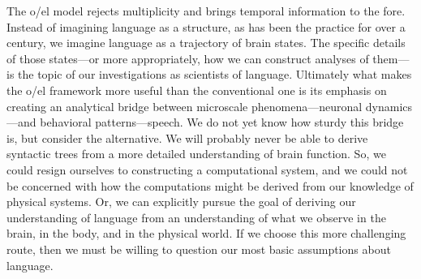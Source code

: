   The o/el model rejects multiplicity and brings temporal information to the fore. Instead of imagining language as a structure, as has been the practice for over a century, we imagine language as a trajectory of brain states. The specific details of those states—or more appropriately, how we can construct analyses of them—is the topic of our investigations as scientists of language. Ultimately what makes the o/el framework more useful than the conventional one is its emphasis on creating an analytical bridge between microscale phenomena—neuronal dynamics—and  behavioral patterns—speech. We do not yet know how sturdy this bridge is, but consider the alternative. We will probably never be able to derive syntactic trees from a more detailed understanding of brain function. So, we could resign ourselves to constructing a computational system, and we could not be concerned with how the computations might be derived from our knowledge of physical systems. Or, we can explicitly pursue the goal of deriving our understanding of language from an understanding of what we observe in the brain, in the body, and in the physical world. If we choose this more challenging route, then we must be willing to question our most basic assumptions about language.

